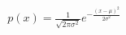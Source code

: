 \documentclass[preview]{standalone}
\begin{document}
\begin{align*}
p(x) = \frac{1}{\sqrt{2\pi\sigma^2}} e^{-\frac{(x-\mu)^2}{2\sigma^2}}
\end{align*}
\end{document}

